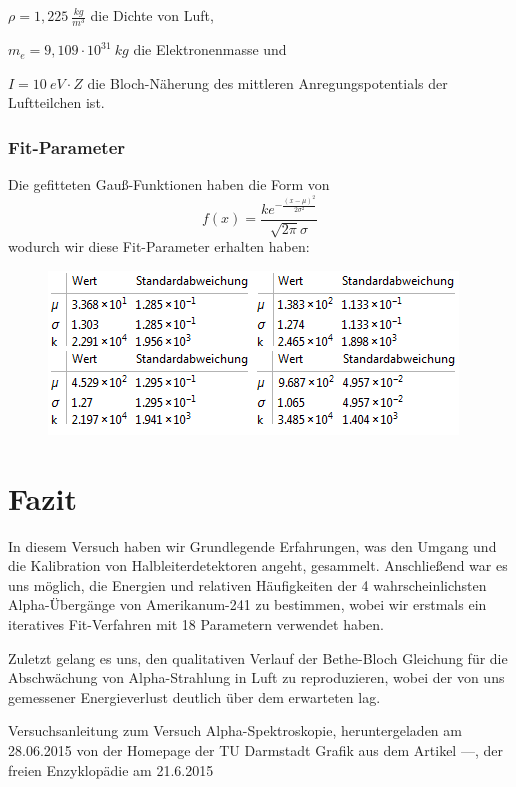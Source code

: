 \documentclass[bigchapter,colorback,accentcolor=tud4b,linedtoc,11pt]{tudreport}
\begin{document}
$\rho = 1,225~ \frac{kg}{m^3}$ die Dichte von Luft,

$m_e = 9,109 \cdot 10^{31}~ kg$ die Elektronenmasse und

$I = 10~ eV \cdot Z$ die Bloch-Näherung des mittleren Anregungspotentials der Luftteilchen ist.

\subsection{Fit-Parameter}
Die gefitteten Gauß-Funktionen haben die Form von 
$$f(x)=\frac{k e^{-\frac{(x-\mu )^2}{2 \sigma ^2}}}{\sqrt{2 \pi } \sigma }$$
wodurch wir diese Fit-Parameter erhalten haben:
\begin{figure}[H]
\centering
    \includegraphics[scale=1]{img/kalibr-gauss-fits-parameter.png}
\end{figure}

\chapter{Fazit}
In diesem Versuch haben wir Grundlegende Erfahrungen, was den Umgang und die
Kalibration von Halbleiterdetektoren angeht, gesammelt. Anschließend war es uns
möglich, die Energien und relativen Häufigkeiten der 4 wahrscheinlichsten Alpha-Übergänge von
Amerikanum-241 zu bestimmen, wobei wir erstmals ein iteratives Fit-Verfahren mit
18 Parametern verwendet haben.

Zuletzt gelang es uns, den qualitativen Verlauf der Bethe-Bloch Gleichung für
die Abschwächung von Alpha-Strahlung in Luft zu reproduzieren, wobei der von uns
gemessener Energieverlust deutlich über dem erwarteten lag.
\cleardoublepage{}
\newpage
\begin{thebibliography}{100}
   Versuchsanleitung zum Versuch Alpha-Spektroskopie, heruntergeladen am 28.06.2015 von der Homepage der TU Darmstadt
   Grafik aus dem Artikel ---, der freien Enzyklopädie am 21.6.2015 \url{}
  
\end{thebibliography}
\end{document}
